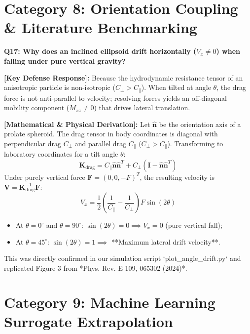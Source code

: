 \documentclass[11pt,a4paper]{article}
\newcommand{\question}[2]{
    \vspace{0.4cm}
    \noindent\colorbox{blue!10}{\parbox{\dimexpr\textwidth-2\fboxsep\relax}{
        \textbf{#1: #2}
    }}
    \vspace{0.2cm}
}
\newcommand{\shortanswer}[1]{
    \noindent\textbf{\textcolor{green!50!black}{[Key Defense Response]:}} #1
    \vspace{0.2cm}
}
\newcommand{\deepdetails}[1]{
    \noindent\textbf{\textcolor{blue!60!black}{[Mathematical \& Physical Derivation]:}} #1
    \vspace{0.2cm}
}
\begin{document}
\section{Category 8: Orientation Coupling & Literature Benchmarking}

\question{Q17}{Why does an inclined ellipsoid drift horizontally ($V_x \ne 0$) when falling under pure vertical gravity?}

\shortanswer{Because the hydrodynamic resistance tensor of an anisotropic particle is non-isotropic ($C_\perp > C_\parallel$). When tilted at angle $\theta$, the drag force is not anti-parallel to velocity; resolving forces yields an off-diagonal mobility component ($M_{xz} \ne 0$) that drives lateral translation.}

\deepdetails{
Let $\hat{\mathbf{n}}$ be the orientation axis of a prolate spheroid. The drag tensor in body coordinates is diagonal with perpendicular drag $C_\perp$ and parallel drag $C_\parallel$ ($C_\perp > C_\parallel$).
Transforming to laboratory coordinates for a tilt angle $\theta$:
\begin{equation}
    \mathbf{K}_{\text{drag}} = C_\parallel \hat{\mathbf{n}}\hat{\mathbf{n}}^T + C_\perp (\mathbf{I} - \hat{\mathbf{n}}\hat{\mathbf{n}}^T)
\end{equation}
Under purely vertical force $\mathbf{F} = (0, 0, -F)^T$, the resulting velocity is $\mathbf{V} = \mathbf{K}_{\text{drag}}^{-1} \mathbf{F}$:
\begin{equation}
    V_x = \frac{1}{2} \left( \frac{1}{C_\parallel} - \frac{1}{C_\perp} \right) F \sin(2\theta)
\end{equation}
\begin{itemize}
    \item At $\theta = 0^\circ$ and $\theta = 90^\circ$: $\sin(2\theta) = 0 \implies V_x = 0$ (pure vertical fall);
    \item At $\theta = 45^\circ$: $\sin(2\theta) = 1 \implies$ **Maximum lateral drift velocity**.
\end{itemize}
This was directly confirmed in our simulation script `plot_angle_drift.py` and replicated Figure 3 from *Phys. Rev. E 109, 065302 (2024)*.
}

\section{Category 9: Machine Learning Surrogate Extrapolation}
\end{document}
